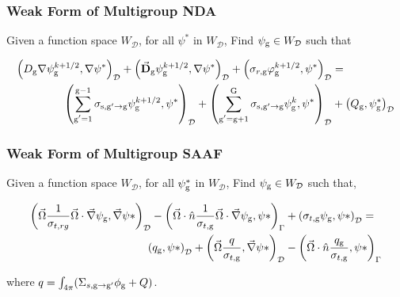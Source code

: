 \subsubsection{Weak Form of Multigroup NDA}

Given a function space $W_\mathcal{D}$, for all $\psi^*$ in $W_\mathcal{D}$, Find $\psi_{\mathrm{g}} \in W_\mathcal{D}$ such that

\begin{equation}
 \begin{split}
  \left(D_{\mathrm{g}} \nabla \psi_{\mathrm{g}}^{k+1/2}, \nabla \psi^*\right)_\mathcal{D} + \left(\vec{\bf{D}}_{\mathrm{g}} \psi_{\mathrm{g}}^{k+1/2} , \nabla \psi^*\right)_\mathcal{D} +  \left(\sigma_{r,\mathrm{g}} \varphi_{\mathrm{g}}^{k+1/2}, \psi^*\right)_\mathcal{D} &=  \\
   \left(\sum\limits_{\substack{\mathrm{g}'=1}}^{\mathrm{g-1}} \sigma_{\mathrm{s},\mathrm{g}' \to\mathrm{g}}\psi_{\mathrm{g}}^{k+1/2}, \psi^*\right)_\mathcal{D} + \left(\sum\limits_{\substack{\mathrm{g}'=\mathrm{g}+1}}^{\mathrm{G}} \sigma_{\mathrm{s},\mathrm{g}' \to\mathrm{g}}\psi_{\mathrm{g}}^{k}, \psi^*\right)_\mathcal{D} 
  &+ \left(Q_{\mathrm{g}}, \psi^*_{\mathrm{g}}\right)_\mathcal{D} 
 \end{split}
 \label{k1/2}
\end{equation}


\subsubsection{Weak Form of Multigroup SAAF}

Given a function space $W_\mathcal{D}$, for all $\psi^*_{\mathrm{g}}$ in $W_\mathcal{D}$, Find $\psi_{\mathrm{g}} \in W_\mathcal{D}$ such that,

\begin{equation}
\begin{split}
        \left ( \vec{\Omega}\frac{1}{\sigma_{t, rg}}\vec{\Omega}\cdot \vec{\nabla}\psi_{\mathrm{g}}, \vec{\nabla}\psi* \right)_\mathcal{D} -     \left ( \vec{\Omega}\cdot \hat{n} \frac{1}{\sigma_{t, \mathrm{g}}}\vec{\Omega} \cdot \vec{\nabla} \psi_{\mathrm{g}},\psi* \right )_{\Gamma} &+ \left ( \sigma_{t, \mathrm{g}} \psi_{\mathrm{g}}, \psi* \right )_\mathcal{D} = \\
        \left ( q_{\mathrm{g}}, \psi* \right)_\mathcal{D} + \left ( \vec{\Omega} \frac{q}{\sigma_{t, \mathrm{g}}}, \vec{\nabla}\psi* \right)_\mathcal{D} &- \left ( \vec{\Omega}\cdot \hat{n} \frac{q_{\mathrm{g}}}{\sigma_{t, \mathrm{g}}}, \psi* \right)_{\Gamma} 
    \end{split}
\end{equation}

where $q = \int_{4\pi}(\Sigma_{s, \mathrm{g} \rightarrow \mathrm{g}'}\phi_{\mathrm{g}} + Q)$.
